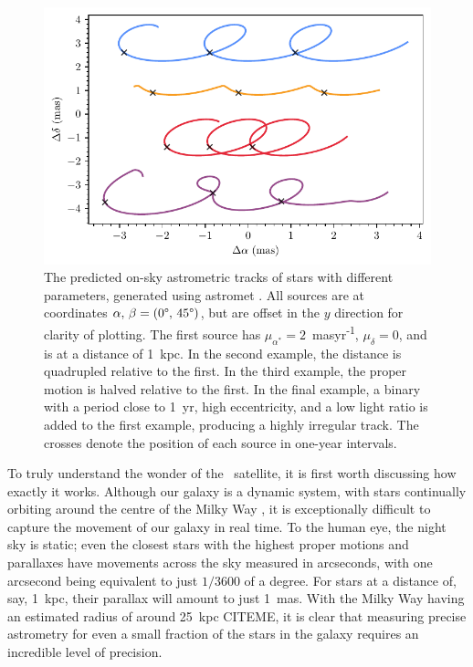 \begin{figure}[tb]
	\includegraphics[width=\textwidth]{fig/c1/tracks.pdf}
	\caption[The predicted on-sky astrometric tracks of stars with different parameters]{The predicted on-sky astrometric tracks of stars with different parameters, generated using astromet \citep{penoyre_astrometric_2022}. All sources are at coordinates $\alpha,\,\beta=(0\degree,\,45\degree)$, but are offset in the $y$ direction for clarity of plotting. The first source has $\mu_{\alpha^*}=2$~masyr\textsuperscript{-1}, $\mu_{\delta}=0$, and is at a distance of 1~kpc. In the second example, the distance is quadrupled relative to the first. In the third example, the proper motion is halved relative to the first. In the final example, a binary with a period close to 1~yr, high eccentricity, and a low light ratio is added to the first example, producing a highly irregular track. The crosses denote the position of each source in one-year intervals.}
	\label{fig:intro:history:gaia_tracks}
\end{figure}

To truly understand the wonder of the \gaia\ satellite, it is first worth discussing how exactly it works. Although our galaxy is a dynamic system, with stars continually orbiting around the centre of the Milky Way \citep{binney_galactic_1987}, it is exceptionally difficult to capture the movement of our galaxy in real time. To the human eye, the night sky is static; even the closest stars with the highest proper motions and parallaxes have movements across the sky measured in arcseconds, with one arcsecond being equivalent to just $1/3600$ of a degree. For stars at a distance of, say, 1~kpc, their parallax will amount to just 1~mas. With the Milky Way having an estimated radius of around 25~kpc CITEME, it is clear that measuring precise astrometry for even a small fraction of the stars in the galaxy requires an incredible level of precision.

